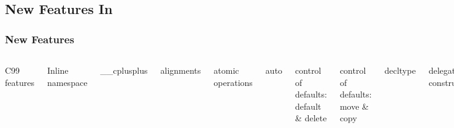 
\lyxframeend{}\subsection[New Features]{New Features In }

\begin{frame}[fragile]
\frametitle{New Features}

\begin{columns}[t]

{\scriptsize
C99 features

Inline namespace

\_\_cplusplus

alignments

atomic operations

auto

control of defaults: default \& delete

control of defaults: move \& copy

decltype

delegating constructors

explicit conversion operators

extended integer types

extern templates

lambdas

null pointer (nullptr)

rvalue references / move ops

}
{\scriptsize
attributes: {[[carries\_dependency]]}, [[noreturn]]

Dynamic Initialization and Destruction with Concurrency

Uniform initialization syntax and semantics

constant expressions (constexpr)

copying and rethrowing exceptions

enum class (scoped and strongly typed enums)

exception propagation (preventing it; noexcept)

in-class member initializers

inherited constructors

initializer lists (uniform and general initialization)

local classes as template arguments

long long integers (at least 64 bits)

narrowing (how to prevent it)

override controls: final, override

}
\end{columns}
\end{frame}
